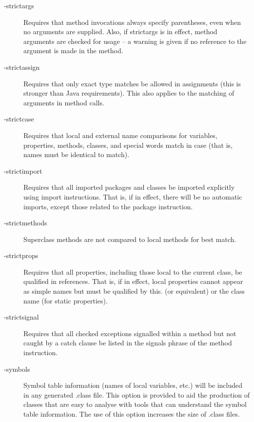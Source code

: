 \begin{description}
\item[-strictargs]
Requires that method invocations always specify parentheses, even when no arguments are supplied. Also, if strictargs is in effect, method arguments are checked for usage – a warning is given if no reference to the argument is made in the method.
\item[-strictassign]
Requires that only exact type matches be allowed in assignments (this is stronger than Java requirements). This also applies to the matching of arguments in method calls.
\item[-strictcase]
Requires that local and external name comparisons for variables, properties, methods, classes, and special words match in case (that is, names must be identical to match).
\item[-strictimport]
Requires that all imported packages and classes be imported explicitly using import instructions. That is, if in effect, there will be no automatic imports, except those related to the package instruction.
\item[-strictmethods]
Superclass methods are not compared to local methods for best match.
\item[-strictprops]
Requires that all properties, including those local to the current class, be qualified in references. That is, if in effect, local properties cannot appear as simple names but must be qualified by this. (or equivalent) or the class name (for static properties).
\item[-strictsignal]
Requires that all checked exceptions signalled within a method but not caught by a catch clause be listed in the signals phrase of the method instruction.
\item[-symbols]
Symbol table information (names of local variables, etc.) will be included in any generated .class file. This option is provided to aid the production of classes that are easy to analyse with tools that can understand the symbol table information. The use of this option increases the size of .class files.

\end{description}

